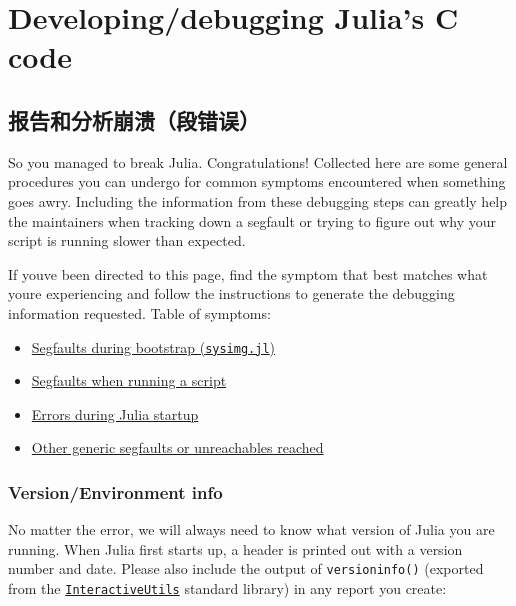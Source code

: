 \chapter{Developing/debugging Julia's C code}


\hypertarget{14100866936909376046}{}


\section{报告和分析崩溃（段错误）}



So you managed to break Julia.  Congratulations!  Collected here are some general procedures you can undergo for common symptoms encountered when something goes awry.  Including the information from these debugging steps can greatly help the maintainers when tracking down a segfault or trying to figure out why your script is running slower than expected.



If you{\textquotesingle}ve been directed to this page, find the symptom that best matches what you{\textquotesingle}re experiencing and follow the instructions to generate the debugging information requested.  Table of symptoms:



\begin{itemize}
\item \hyperlink{13671941627037387928}{Segfaults during bootstrap (\texttt{sysimg.jl})}


\item \hyperlink{17238593239204343556}{Segfaults when running a script}


\item \hyperlink{15906783386188107842}{Errors during Julia startup}


\item \hyperlink{9648352711765890842}{Other generic segfaults or unreachables reached}

\end{itemize}


\hypertarget{13046485394122703550}{}


\subsection{Version/Environment info}



No matter the error, we will always need to know what version of Julia you are running. When Julia first starts up, a header is printed out with a version number and date. Please also include the output of \texttt{versioninfo()} (exported from the \hyperlink{11698106121547091928}{\texttt{InteractiveUtils}} standard library) in any report you create:




